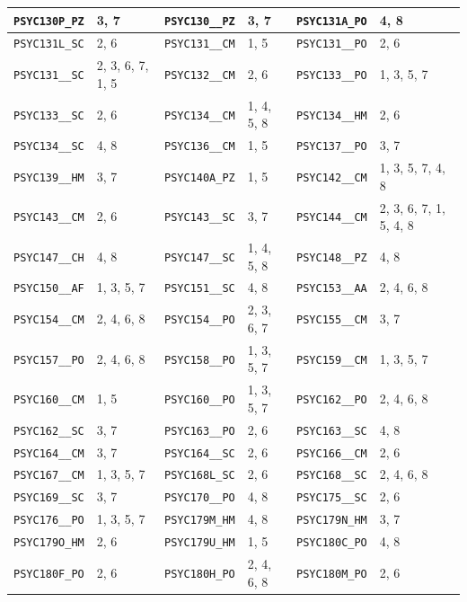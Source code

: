 \begin{longtable}{|l|l||l|l||l|l|}
    \verb|PSYC130P_PZ| & 3, 7 & \verb|PSYC130__PZ| & 3, 7 & \verb|PSYC131A_PO| & 4, 8\\\hline
    \verb|PSYC131L_SC| & 2, 6 & \verb|PSYC131__CM| & 1, 5 & \verb|PSYC131__PO| & 2, 6\\\hline
    \verb|PSYC131__SC| & 2, 3, 6, 7, 1, 5 & \verb|PSYC132__CM| & 2, 6 & \verb|PSYC133__PO| & 1, 3, 5, 7\\\hline
    \verb|PSYC133__SC| & 2, 6 & \verb|PSYC134__CM| & 1, 4, 5, 8 & \verb|PSYC134__HM| & 2, 6\\\hline
    \verb|PSYC134__SC| & 4, 8 & \verb|PSYC136__CM| & 1, 5 & \verb|PSYC137__PO| & 3, 7\\\hline
    \verb|PSYC139__HM| & 3, 7 & \verb|PSYC140A_PZ| & 1, 5 & \verb|PSYC142__CM| & 1, 3, 5, 7, 4, 8\\\hline
    \verb|PSYC143__CM| & 2, 6 & \verb|PSYC143__SC| & 3, 7 & \verb|PSYC144__CM| & 2, 3, 6, 7, 1, 5, 4, 8\\\hline
    \verb|PSYC147__CH| & 4, 8 & \verb|PSYC147__SC| & 1, 4, 5, 8 & \verb|PSYC148__PZ| & 4, 8\\\hline
    \verb|PSYC150__AF| & 1, 3, 5, 7 & \verb|PSYC151__SC| & 4, 8 & \verb|PSYC153__AA| & 2, 4, 6, 8\\\hline
    \verb|PSYC154__CM| & 2, 4, 6, 8 & \verb|PSYC154__PO| & 2, 3, 6, 7 & \verb|PSYC155__CM| & 3, 7\\\hline
    \verb|PSYC157__PO| & 2, 4, 6, 8 & \verb|PSYC158__PO| & 1, 3, 5, 7 & \verb|PSYC159__CM| & 1, 3, 5, 7\\\hline
    \verb|PSYC160__CM| & 1, 5 & \verb|PSYC160__PO| & 1, 3, 5, 7 & \verb|PSYC162__PO| & 2, 4, 6, 8\\\hline
    \verb|PSYC162__SC| & 3, 7 & \verb|PSYC163__PO| & 2, 6 & \verb|PSYC163__SC| & 4, 8\\\hline
    \verb|PSYC164__CM| & 3, 7 & \verb|PSYC164__SC| & 2, 6 & \verb|PSYC166__CM| & 2, 6\\\hline
    \verb|PSYC167__CM| & 1, 3, 5, 7 & \verb|PSYC168L_SC| & 2, 6 & \verb|PSYC168__SC| & 2, 4, 6, 8\\\hline
    \verb|PSYC169__SC| & 3, 7 & \verb|PSYC170__PO| & 4, 8 & \verb|PSYC175__SC| & 2, 6\\\hline
    \verb|PSYC176__PO| & 1, 3, 5, 7 & \verb|PSYC179M_HM| & 4, 8 & \verb|PSYC179N_HM| & 3, 7\\\hline
    \verb|PSYC179O_HM| & 2, 6 & \verb|PSYC179U_HM| & 1, 5 & \verb|PSYC180C_PO| & 4, 8\\\hline
    \verb|PSYC180F_PO| & 2, 6 & \verb|PSYC180H_PO| & 2, 4, 6, 8 & \verb|PSYC180M_PO| & 2, 6\\\hline

\end{longtable}
